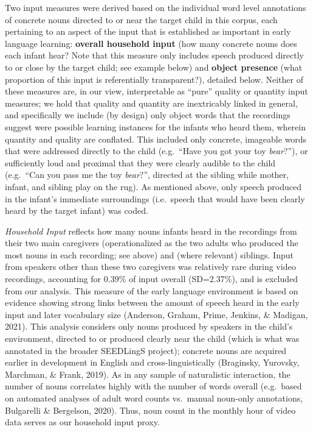 \documentclass[
  man,mask,floatsintext]{apa6}
\begin{document}
Two input measures were derived based on the individual word level annotations of concrete nouns directed to or near the target child in this corpus, each pertaining to an aspect of the input that is established as important in early language learning: \textbf{overall household input} (how many concrete nouns does each infant hear? Note that this measure only includes speech produced directly to or close by the target child; see example below) and \textbf{object presence} (what proportion of this input is referentially transparent?), detailed below. Neither of these measures are, in our view, interpretable as ``pure'' quality or quantity input measures; we hold that quality and quantity are inextricably linked in general, and specifically we include (by design) only object words that the recordings suggest were possible learning instances for the infants who heard them, wherein quantity and quality are conflated. This included only concrete, imageable words that were addressed directly to the child (e.g.~``Have you got your toy \emph{bear}?''), or sufficiently loud and proximal that they were clearly audible to the child (e.g.~``Can you pass me the toy \emph{bear}?'', directed at the sibling while mother, infant, and sibling play on the rug). As mentioned above, only speech produced in the infant's immediate surroundings (i.e.~speech that would have been clearly heard by the target infant) was coded.

\emph{Household Input} reflects how many nouns infants heard in the recordings from their two main caregivers (operationalized as the two adults who produced the most nouns in each recording; see above) and (where relevant) siblings. Input from speakers other than these two caregivers was relatively rare during video recordings, accounting for 0.39\% of input overall (SD=2.37\%), and is excluded from our analysis. This measure of the early language environment is based on evidence showing strong links between the amount of speech heard in the early input and later vocabulary size (Anderson, Graham, Prime, Jenkins, \& Madigan, 2021). This analysis considers only nouns produced by speakers in the child's environment, directed to or produced clearly near the child (which is what was annotated in the broader SEEDLingS project); concrete nouns are acquired earlier in development in English and cross-linguistically (Braginsky, Yurovsky, Marchman, \& Frank, 2019). As in any sample of naturalistic interaction, the number of nouns correlates highly with the number of words overall (e.g.~based on automated analyses of adult word counts vs.~manual noun-only annotations, Bulgarelli \& Bergelson, 2020). Thus, noun count in the monthly hour of video data serves as our household input proxy.
\end{document}
